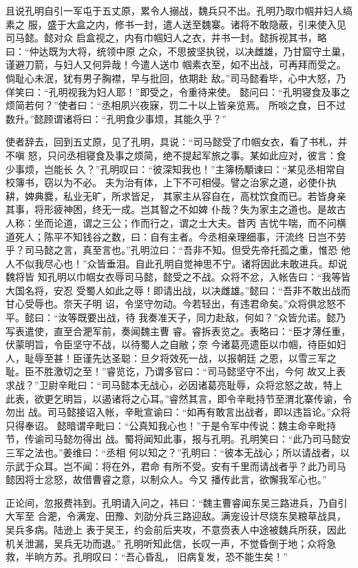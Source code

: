 且说孔明自引一军屯于五丈原，累令人搦战，魏兵只不出。孔明乃取巾帼并妇人缟素之
服，盛于大盒之内，修书一封，遣人送至魏寨。诸将不敢隐蔽，引来使入见司马懿。懿对众
启盒视之，内有巾帼妇人之衣，并书一封。懿拆视其书，略曰：“仲达既为大将，统领中原
之众，不思披坚执锐，以决雌雄，乃甘窟守土巢，谨避刀箭，与妇人又何异哉！今遣人送巾
帼素衣至，如不出战，可再拜而受之。倘耻心未泯，犹有男子胸襟，早与批回，依期赴
敌。”司马懿看毕，心中大怒，乃佯笑曰：“孔明视我为妇人耶！”即受之，令重待来使。
懿问曰：“孔明寝食及事之烦简若何？”使者曰：“丞相夙兴夜寐，罚二十以上皆亲览焉。
所啖之食，日不过数升。”懿顾谓诸将曰：“孔明食少事烦，其能久乎？”

使者辞去，回到五丈原，见了孔明，具说：“司马懿受了巾帼女衣，看了书札，并不嗔
怒，只问丞相寝食及事之烦简，绝不提起军旅之事。某如此应对，彼言：食少事烦，岂能长
久？”孔明叹曰：“彼深知我也！”主簿杨顒谏曰：“某见丞相常自校簿书，窃以为不必。
夫为治有体，上下不可相侵。譬之治家之道，必使仆执耕，婢典爨，私业无旷，所求皆足，
其家主从容自在，高枕饮食而已。若皆身亲其事，将形疲神困，终无一成。岂其智之不如婢
仆哉？失为家主之道也。是故古人称：坐而论道，谓之三公；作而行之，谓之士大夫。昔丙
吉忧牛喘，而不问横道死人；陈平不知钱谷之数，曰：自有主者。今丞相亲理细事，汗流终
日岂不劳乎？司马懿之言，真至言也。”孔明泣曰：“吾非不知。但受先帝托孤之重，惟恐
他人不似我尽心也！”众皆垂泪。自此孔明自觉神思不宁。诸将因此未敢进兵。却说魏将皆
知孔明以巾帼女衣辱司马懿，懿受之不战。众将不忿，入帐告曰：“我等皆大国名将，安忍
受蜀人如此之辱！即请出战，以决雌雄。”懿曰：“吾非不敢出战而甘心受辱也。奈天子明
诏，令坚守勿动。今若轻出，有违君命矣。”众将俱忿怒不平。懿曰：“汝等既要出战，待
我奏准天子，同力赴敌，何如？”众皆允诺。懿乃写表遣使，直至合淝军前，奏闻魏主曹
睿。睿拆表览之。表略曰：“臣才薄任重，伏蒙明旨，令臣坚守不战，以待蜀人之自敝；奈
今诸葛亮遗臣以巾帼，待臣如妇人，耻辱至甚！臣谨先达圣聪：旦夕将效死一战，以报朝廷
之恩，以雪三军之耻。臣不胜激切之至！”睿览讫，乃谓多官曰：“司马懿坚守不出，今何
故又上表求战？”卫尉辛毗曰：“司马懿本无战心，必因诸葛亮耻辱，众将忿怒之故，特上
此表，欲更乞明旨，以遏诸将之心耳。”睿然其言，即令辛毗持节至渭北寨传谕，令勿出
战。司马懿接诏入帐，辛毗宣谕曰：“如再有敢言出战者，即以违旨论。”众将只得奉诏。
懿暗谓辛毗曰：“公真知我心也！”于是令军中传说：魏主命辛毗持节，传谕司马懿勿得出
战。蜀将闻知此事，报与孔明。孔明笑曰：“此乃司马懿安三军之法也。”姜维曰：“丞相
何以知之？”孔明曰：“彼本无战心；所以请战者，以示武于众耳。岂不闻：将在外，君命
有所不受。安有千里而请战者乎？此乃司马懿因将士忿怒，故借曹睿之意，以制众人。今又
播传此言，欲懈我军心也。”

正论间，忽报费祎到。孔明请入问之，祎曰：“魏主曹睿闻东吴三路进兵，乃自引大军至
合淝，令满宠、田豫、刘劭分兵三路迎敌。满宠设计尽烧东吴粮草战具，吴兵多病。陆逊上
表于吴王，约会前后夹攻，不意赍表人中途被魏兵所获，因此机关泄漏，吴兵无功而退。”
孔明听知此信，长叹一声，不觉昏倒于地；众将急救，半晌方苏。孔明叹曰：“吾心昏乱，
旧病复发，恐不能生矣！”


